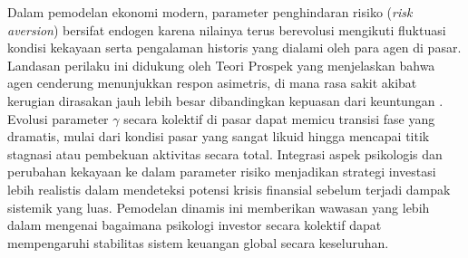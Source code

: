 Dalam pemodelan ekonomi modern, parameter penghindaran risiko (\textit{risk aversion}) bersifat endogen karena nilainya terus berevolusi mengikuti fluktuasi kondisi kekayaan serta pengalaman historis yang dialami oleh para agen di pasar. Landasan perilaku ini didukung oleh Teori Prospek yang menjelaskan bahwa agen cenderung menunjukkan respon asimetris, di mana rasa sakit akibat kerugian dirasakan jauh lebih besar dibandingkan kepuasan dari keuntungan \cite{kahneman_prospect_1979}. Evolusi parameter $\gamma$ secara kolektif di pasar dapat memicu transisi fase yang dramatis, mulai dari kondisi pasar yang sangat likuid hingga mencapai titik stagnasi atau pembekuan aktivitas secara total. Integrasi aspek psikologis dan perubahan kekayaan ke dalam parameter risiko menjadikan strategi investasi lebih realistis dalam mendeteksi potensi krisis finansial sebelum terjadi dampak sistemik yang luas. Pemodelan dinamis ini memberikan wawasan yang lebih dalam mengenai bagaimana psikologi investor secara kolektif dapat mempengaruhi stabilitas sistem keuangan global secara keseluruhan.
